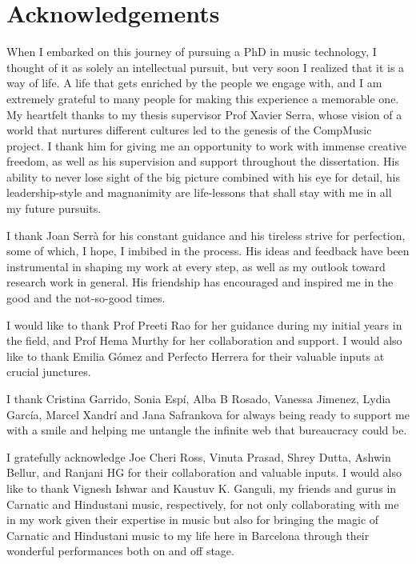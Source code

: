 \chapter*{Acknowledgements}

When I embarked on this journey of pursuing a PhD in music technology, I thought of it as solely an intellectual pursuit, but very soon I realized that it is a way of life. A life that gets enriched by the people we engage with, and I am extremely grateful to many people for making this experience a memorable one. My heartfelt thanks to my thesis supervisor Prof Xavier Serra, whose vision of a world that nurtures different cultures led to the genesis of the CompMusic project. I thank him for giving me an opportunity to work with immense creative freedom, as well as his supervision and support throughout the dissertation. His ability to never lose sight of the big picture combined with his eye for detail, his leadership-style and magnanimity are life-lessons that shall stay with me in all my future pursuits.

I thank Joan Serrà for his constant guidance and his tireless strive for perfection, some of which, I hope, I imbibed in the process. His ideas and feedback have been instrumental in shaping my work at every step, as well as my outlook toward research work in general. His friendship has encouraged and inspired me in the good and the not-so-good times. 

I would like to thank Prof Preeti Rao for her guidance during my initial years in the field, and Prof Hema Murthy for her collaboration and support. I would also like to thank Emilia Gómez and Perfecto Herrera for their valuable inputs at crucial junctures.  

I thank Cristina Garrido, Sonia Espí, Alba B Rosado, Vanessa Jimenez, Lydia García, Marcel Xandrí and Jana Safrankova for always being ready to support me with a smile and helping me untangle the infinite web that bureaucracy could be. 

I gratefully acknowledge Joe Cheri Ross, Vinuta Prasad, Shrey Dutta, Ashwin Bellur, and Ranjani HG for their collaboration and valuable inputs. I would also like to thank Vignesh Ishwar and Kaustuv K. Ganguli, my friends and gurus in Carnatic and Hindustani music, respectively, for not only collaborating with me in my work given their expertise in music but also for bringing the magic of Carnatic and Hindustani music to my life here in Barcelona through their wonderful performances both on and off stage.


